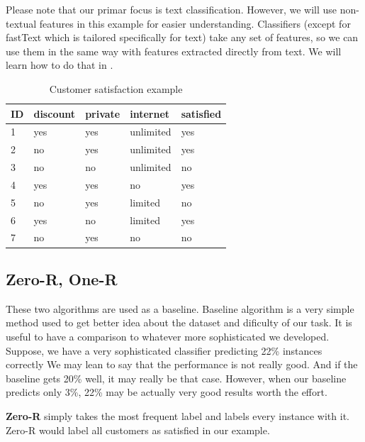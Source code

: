 Please note that our primar focus is text classification.
However, we will use non-textual features in this example for easier understanding.
Classifiers (except for fastText which is tailored specifically for text) take any set of features,
so we can use them in the same way with features extracted directly from text.
We will learn how to do that in .

\begin{table}[h!]

\centering
\begin{tabular}{lllll}
\toprule
\textbf{ID} & \textbf{discount} & \textbf{private} & \textbf{internet} \hspace{1.cm} & \textbf{satisfied} \\
\midrule
1 & yes & yes & unlimited & yes \\
2 & no & yes & unlimited & yes \\
3 & no & no & unlimited & no \\
4 & yes & yes & no & yes \\
5 & no & yes & limited & no \\
6 & yes & no & limited & yes \\
7 & no & yes & no & no \\
\bottomrule
\end{tabular}

\caption{Customer satisfaction example}\label{tab:custsatis}
\end{table}






\subsection{Zero-R, One-R}

These two algorithms are used as a baseline.
Baseline algorithm is a very simple method used to get better idea about the dataset and dificulty of our task.
It is useful to have a comparison to whatever more sophisticated we developed.
Suppose, we have a very sophisticated classifier predicting 22\% instances correctly
We may lean to say that the performance is not really good.
And if the baseline gets 20\% well, it may really be that case.
However, when our baseline predicts only 3\%, 22\% may be actually very good results worth the effort.

{\bf Zero-R} simply takes the most frequent label and labels every instance with it.
Zero-R would label all customers as satisfied in our example.

